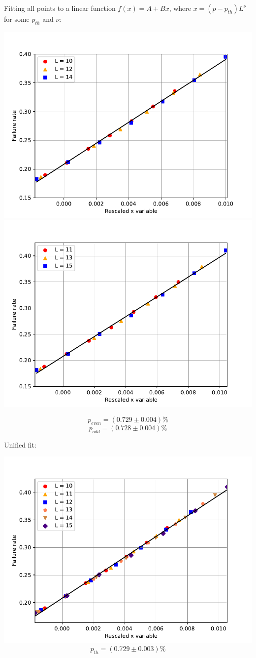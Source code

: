 \documentclass[pra]{revtex4-1}
\begin{document}
\noindent Fitting all points to a linear function $f(x) = A + Bx$, where $x=(p-p_{th})L^{\nu}$ for some $p_{th}$ and $\nu$: 
  
\includegraphics[width=.49\textwidth]{../graphs-paper2/sda-dephasing-even-rescaled.pdf}
\includegraphics[width=.49\textwidth]{../graphs-paper2/sda-dephasing-odd-rescaled.pdf}

\[  p_{even} = (0.729 \pm 0.004)\% \]
\[  p_{odd} = (0.728 \pm 0.004)\% \]
\clearpage 

Unified fit: \begin{center} 

\includegraphics[width=.9\textwidth]{../graphs-paper2/sda-dephasing-rescaled.pdf}
\[  p_{th} = (0.729 \pm 0.003)\% \] \end{center}
\clearpage 
\end{document}
